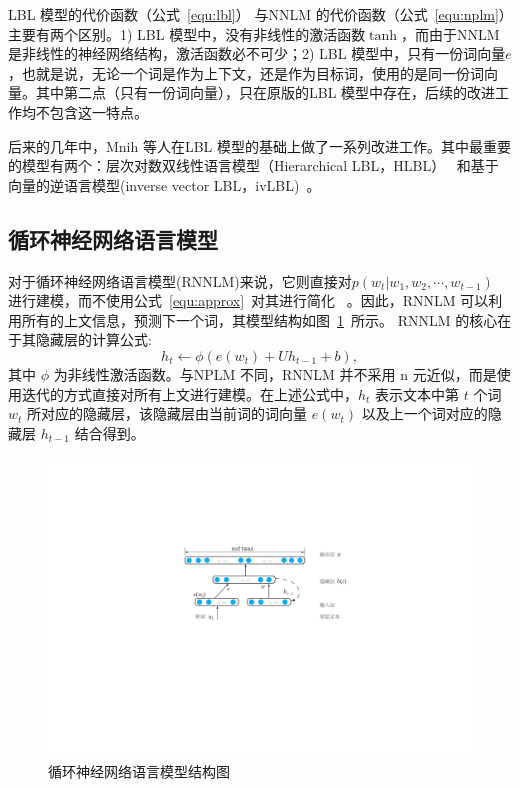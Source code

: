 LBL 模型的代价函数（公式~\ref{equ:lbl}） 与NNLM 的代价函数（公式~\ref{equ:nplm}）主要有两个区别。1) LBL 模型中，没有非线性的激活函数$\tanh$，而由于NNLM 是非线性的神经网络结构，激活函数必不可少；2) LBL 模型中，只有一份词向量$e$，也就是说，无论一个词是作为上下文，还是作为目标词，使用的是同一份词向量。其中第二点（只有一份词向量），只在原版的LBL 模型中存在，后续的改进工作均不包含这一特点。

后来的几年中，Mnih 等人在LBL 模型的基础上做了一系列改进工作。其中最重要的模型有两个：层次对数双线性语言模型（Hierarchical LBL，HLBL）~ 和基于向量的逆语言模型(inverse vector LBL，ivLBL)~。

\subsection{循环神经网络语言模型}
对于循环神经网络语言模型(RNNLM)来说，它则直接对$p(w_t | w_1,w_2,\cdots,w_{t-1}) $ 进行建模，而不使用公式~\ref{equ:approx}~对其进行简化~ 。因此，RNNLM 可以利用所有的上文信息，预测下一个词，其模型结构如图~\ref{fig:rnnlm}~所示。
RNNLM 的核心在于其隐藏层的计算公式:
\begin{equation}
\label{equ:rnn}
  h_t \leftarrow  \phi(e(w_t) + U h_{t-1} +b),
\end{equation}
其中 $\phi$ 为非线性激活函数。与NPLM 不同，RNNLM 并不采用 n 元近似，而是使用迭代的方式直接对所有上文进行建模。在上述公式中，$h_t$ 表示文本中第 $t$ 个词 $w_t$ 所对应的隐藏层，该隐藏层由当前词的词向量 $e(w_t)$ 以及上一个词对应的隐藏层 $h_{t -1}$ 结合得到。

\begin{figure}
  \centering
  \includegraphics[width=1\linewidth]{./figures/rnnlm.pdf}
  \caption{循环神经网络语言模型结构图}\label{fig:rnnlm}
\end{figure}

